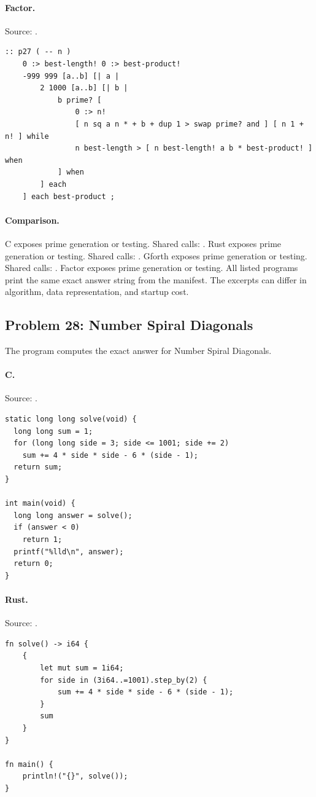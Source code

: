 \paragraph{Factor.} Source: .
\begin{lstlisting}
:: p27 ( -- n )
    0 :> best-length! 0 :> best-product!
    -999 999 [a..b] [| a |
        2 1000 [a..b] [| b |
            b prime? [
                0 :> n!
                [ n sq a n * + b + dup 1 > swap prime? and ] [ n 1 + n! ] while
                n best-length > [ n best-length! a b * best-product! ] when
            ] when
        ] each
    ] each best-product ;
\end{lstlisting}

\paragraph{Comparison.}
C exposes prime generation or testing. Shared calls: \texttt{}. Rust exposes prime generation or testing. Shared calls: \texttt{}. Gforth exposes prime generation or testing. Shared calls: \texttt{}. Factor exposes prime generation or testing.
All listed programs print the same exact answer string from the manifest. The excerpts can differ in algorithm, data representation, and startup cost.

\subsection{Problem 28: Number Spiral Diagonals}
\label{walkthrough:p28}
The program computes the exact answer for Number Spiral Diagonals.

\paragraph{C.} Source: .
\begin{lstlisting}
static long long solve(void) {
  long long sum = 1;
  for (long long side = 3; side <= 1001; side += 2)
    sum += 4 * side * side - 6 * (side - 1);
  return sum;
}

int main(void) {
  long long answer = solve();
  if (answer < 0)
    return 1;
  printf("%lld\n", answer);
  return 0;
}
\end{lstlisting}

\paragraph{Rust.} Source: .
\begin{lstlisting}
fn solve() -> i64 {
    {
        let mut sum = 1i64;
        for side in (3i64..=1001).step_by(2) {
            sum += 4 * side * side - 6 * (side - 1);
        }
        sum
    }
}

fn main() {
    println!("{}", solve());
}
\end{lstlisting}

